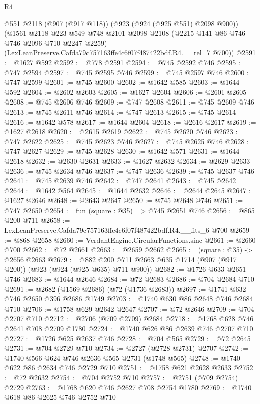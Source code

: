 \begin{lexlean}{R4}
\begin{coremodule}
    @551
    @2118
    (@907 (@917 @118))
    (@923 (@924 (@925 @551) @2098 @900))
    (@1561
      @2118
      @223
      @549
      @748
      @2101
      @2098
      @2108
      (@2215 @141 @86 @746 @746 @2096 @710 @2247 @2259)
      (LexLeanPreserve.Cafda79c757163ffe4c6f07f487422bdf.R4.__rel_7 @700))
@2591 := @1627 @592
@2592 := @778 @2591
@2594 := @745 @2592 @746
@2595 := @747 @2594
@2597 := @745 @2595 @746
@2599 := @745 @2597 @746
@2600 := @747 @2599
@2601 := @745 @2600
@2602 := @1642 @585
@2603 := @1644 @592
@2604 := @2602 @2603
@2605 := @1627 @2604
@2606 := @2601 @2605
@2608 := @745 @2606 @746
@2609 := @747 @2608
@2611 := @745 @2609 @746
@2613 := @745 @2611 @746
@2614 := @747 @2613
@2615 := @745 @2614
@2616 := @1642 @578
@2617 := @1644 @2604
@2618 := @2616 @2617
@2619 := @1627 @2618
@2620 := @2615 @2619
@2622 := @745 @2620 @746
@2623 := @747 @2622
@2625 := @745 @2623 @746
@2627 := @745 @2625 @746
@2628 := @747 @2627
@2629 := @745 @2628
@2630 := @1642 @571
@2631 := @1644 @2618
@2632 := @2630 @2631
@2633 := @1627 @2632
@2634 := @2629 @2633
@2636 := @745 @2634 @746
@2637 := @747 @2636
@2639 := @745 @2637 @746
@2641 := @745 @2639 @746
@2642 := @747 @2641
@2643 := @745 @2642
@2644 := @1642 @564
@2645 := @1644 @2632
@2646 := @2644 @2645
@2647 := @1627 @2646
@2648 := @2643 @2647
@2650 := @745 @2648 @746
@2651 := @747 @2650
@2654 := fun (square : @35) => @745 @2651 @746
@2656 := @865 @200 @711
@2658 := LexLeanPreserve.Cafda79c757163ffe4c6f07f487422bdf.R4.__fits_6 @700
@2659 := @868 @2658
@2660 := VerdantEngine.CircularFunctions.sinc
@2661 := @2660 @700
@2662 := @72 @2661
@2663 := @2659 @2662
@2665 := (square : @35) -> @2656 @2663
@2679 := @882 @200 @711 @2663 @635 @1714 (@907 (@917 @200)) (@923 (@924 (@925 @635) @711 @900))
@2682 := @1726 @633 @2651 @746
@2683 := @1644 @2646
@2684 := @72 @2683
@2686 := @704 @2684 @710
@2691 := @2682 (@1569 @2686) (@72 (@1736 @2683))
@2697 := @1741 @632 @746 @2650 @396 @2686 @1749
@2703 := @1740 @630 @86 @2648 @746 @2684 @710
@2706 := @1758 @629 @2642 @2647
@2707 := @72 @2646
@2709 := @704 @2707 @710
@2712 := @2706 (@709 @2709) @2684
@2718 := @1768 @628 @746 @2641 @708 @2709 @1780
@2724 := @1740 @626 @86 @2639 @746 @2707 @710
@2727 := @1726 @625 @2637 @746
@2728 := @704 @565
@2729 := @72 @2645
@2731 := @704 @2729 @710
@2734 := @2727 (@2728 @2731) @2707
@2742 := @1740 @566 @624 @746 @2636 @565 @2731 (@1748 @565)
@2748 := @1740 @622 @86 @2634 @746 @2729 @710
@2751 := @1758 @621 @2628 @2633
@2752 := @72 @2632
@2754 := @704 @2752 @710
@2757 := @2751 (@709 @2754) @2729
@2763 := @1768 @620 @746 @2627 @708 @2754 @1780
@2769 := @1740 @618 @86 @2625 @746 @2752 @710

\end{coremodule}
\end{lexlean}
